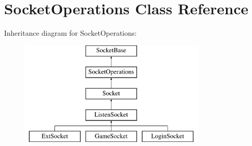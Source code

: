 \hypertarget{classSocketOperations}{\section{\-Socket\-Operations \-Class \-Reference}
\label{classSocketOperations}
}
\-Inheritance diagram for \-Socket\-Operations\-:\begin{figure}[H]
\begin{center}
\leavevmode
\includegraphics[height=5.000000cm]{classSocketOperations}
\end{center}
\end{figure}
